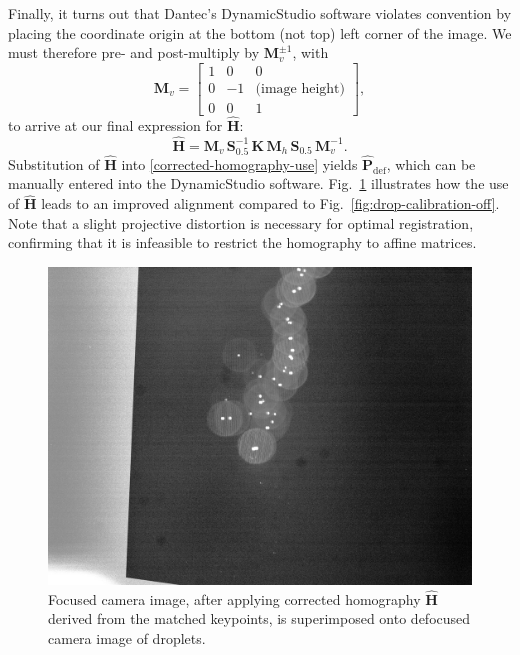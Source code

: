 \documentclass[11.5pt,oneside]{book}
\newcommand*{\figref}[1]{Fig.~\ref{#1}}
\begin{document}
Finally, it turns out that Dantec's DynamicStudio software violates convention
by placing the coordinate origin at the bottom (not top) left corner of the
image. We must therefore pre- and post-multiply by $\mathbf{M}_v^{\pm 1}$, with
\begin{equation*}
    \mathbf{M}_v = \left[ \begin{array}{ccc}
            1 & 0 & 0 \\
    0 & -1 & \text{(image height)} \\
            0 & 0 & 1
    \end{array} \right],
\end{equation*}
to arrive at our final expression for $\mathbf{\hat{H}}$:
\begin{equation}
    \mathbf{\hat{H}} = \mathbf{M}_v\, \mathbf{S}_{0.5}^{-1}\, \mathbf{K}\,
    \mathbf{M}_h\, \mathbf{S}_{0.5}\, \mathbf{M}_v^{-1}.
\end{equation}
Substitution of $\mathbf{\hat{H}}$ into \eqref{corrected-homography-use} yields
$\mathbf{\hat{P}}_\text{def}$, which can be manually entered into the
DynamicStudio software. \figref{fig:drop-calibration-corrected} illustrates
how the use of $\mathbf{\hat{H}}$ leads to an improved alignment compared to
\figref{fig:drop-calibration-off}. Note that a slight projective distortion
is necessary for optimal registration, confirming that it is infeasible to restrict the homography
to affine matrices.

\begin{figure}
    \centering
    \includegraphics[height=0.45\textheight]{img/orb/drop-calibration-corrected.jpg}
    \caption{Focused camera image, after applying corrected homography
        $\mathbf{\hat{H}}$ derived from the matched keypoints, is superimposed onto
    defocused camera image of droplets.}
    \label{fig:drop-calibration-corrected}
\end{figure}
\end{document}

